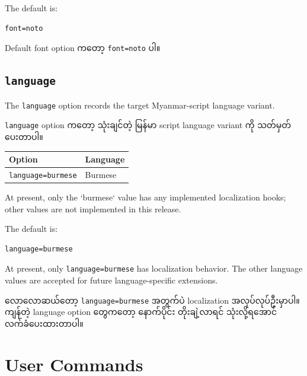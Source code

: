 \documentclass[a4paper,11pt]{article}
\newcommand{\opt}[1]{\texttt{#1}}
\newenvironment{burmese}
  {\par\smallskip\begin{myanmar}\sloppy}
  {\par\end{myanmar}\fussy\smallskip}
\begin{document}
The default is:

\begin{Verbatim}
font=noto
\end{Verbatim}

\begin{burmese}
Default font option ကတော့ \opt{font=noto} ပါ။
\end{burmese}

\subsection{\opt{language}}

The \opt{language} option records the target Myanmar-script language variant.

\begin{burmese}
\opt{language} option ကတော့ သုံးချင်တဲ့ မြန်မာ script language variant ကို 
သတ်မှတ်ပေးတာပါ။
\end{burmese}

\begin{center}
\begin{tabular}{ll}
\toprule
Option & Language \\
\midrule
\opt{language=burmese} & Burmese \\
\bottomrule
\end{tabular}
\end{center}

At present, only the `burmese` value has any implemented localization hooks; other values are not implemented in this release.

The default is:

\begin{Verbatim}
language=burmese
\end{Verbatim}

At present, only \opt{language=burmese} has localization behavior. The other
language values are accepted for future language-specific extensions.

\begin{burmese}
လောလောဆယ်တော့ \opt{language=burmese} အတွက်ပဲ localization အလုပ်လုပ်ဦးမှာပါ။ 
ကျန်တဲ့ language option တွေကတော့ နောက်ပိုင်း တိုးချဲ့လာရင် သုံးလို့ရအောင် 
လက်ခံပေးထားတာပါ။
\end{burmese}

\section{User Commands}
\end{document}
